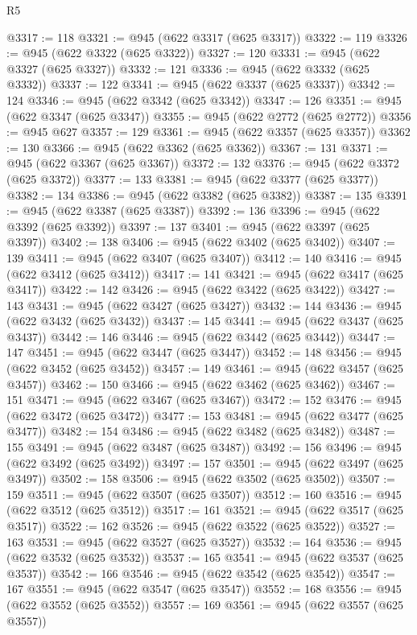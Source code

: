 \begin{lexlean}{R5}
\begin{coremodule}
@3317 := 118
@3321 := @945 (@622 @3317 (@625 @3317))
@3322 := 119
@3326 := @945 (@622 @3322 (@625 @3322))
@3327 := 120
@3331 := @945 (@622 @3327 (@625 @3327))
@3332 := 121
@3336 := @945 (@622 @3332 (@625 @3332))
@3337 := 122
@3341 := @945 (@622 @3337 (@625 @3337))
@3342 := 124
@3346 := @945 (@622 @3342 (@625 @3342))
@3347 := 126
@3351 := @945 (@622 @3347 (@625 @3347))
@3355 := @945 (@622 @2772 (@625 @2772))
@3356 := @945 @627
@3357 := 129
@3361 := @945 (@622 @3357 (@625 @3357))
@3362 := 130
@3366 := @945 (@622 @3362 (@625 @3362))
@3367 := 131
@3371 := @945 (@622 @3367 (@625 @3367))
@3372 := 132
@3376 := @945 (@622 @3372 (@625 @3372))
@3377 := 133
@3381 := @945 (@622 @3377 (@625 @3377))
@3382 := 134
@3386 := @945 (@622 @3382 (@625 @3382))
@3387 := 135
@3391 := @945 (@622 @3387 (@625 @3387))
@3392 := 136
@3396 := @945 (@622 @3392 (@625 @3392))
@3397 := 137
@3401 := @945 (@622 @3397 (@625 @3397))
@3402 := 138
@3406 := @945 (@622 @3402 (@625 @3402))
@3407 := 139
@3411 := @945 (@622 @3407 (@625 @3407))
@3412 := 140
@3416 := @945 (@622 @3412 (@625 @3412))
@3417 := 141
@3421 := @945 (@622 @3417 (@625 @3417))
@3422 := 142
@3426 := @945 (@622 @3422 (@625 @3422))
@3427 := 143
@3431 := @945 (@622 @3427 (@625 @3427))
@3432 := 144
@3436 := @945 (@622 @3432 (@625 @3432))
@3437 := 145
@3441 := @945 (@622 @3437 (@625 @3437))
@3442 := 146
@3446 := @945 (@622 @3442 (@625 @3442))
@3447 := 147
@3451 := @945 (@622 @3447 (@625 @3447))
@3452 := 148
@3456 := @945 (@622 @3452 (@625 @3452))
@3457 := 149
@3461 := @945 (@622 @3457 (@625 @3457))
@3462 := 150
@3466 := @945 (@622 @3462 (@625 @3462))
@3467 := 151
@3471 := @945 (@622 @3467 (@625 @3467))
@3472 := 152
@3476 := @945 (@622 @3472 (@625 @3472))
@3477 := 153
@3481 := @945 (@622 @3477 (@625 @3477))
@3482 := 154
@3486 := @945 (@622 @3482 (@625 @3482))
@3487 := 155
@3491 := @945 (@622 @3487 (@625 @3487))
@3492 := 156
@3496 := @945 (@622 @3492 (@625 @3492))
@3497 := 157
@3501 := @945 (@622 @3497 (@625 @3497))
@3502 := 158
@3506 := @945 (@622 @3502 (@625 @3502))
@3507 := 159
@3511 := @945 (@622 @3507 (@625 @3507))
@3512 := 160
@3516 := @945 (@622 @3512 (@625 @3512))
@3517 := 161
@3521 := @945 (@622 @3517 (@625 @3517))
@3522 := 162
@3526 := @945 (@622 @3522 (@625 @3522))
@3527 := 163
@3531 := @945 (@622 @3527 (@625 @3527))
@3532 := 164
@3536 := @945 (@622 @3532 (@625 @3532))
@3537 := 165
@3541 := @945 (@622 @3537 (@625 @3537))
@3542 := 166
@3546 := @945 (@622 @3542 (@625 @3542))
@3547 := 167
@3551 := @945 (@622 @3547 (@625 @3547))
@3552 := 168
@3556 := @945 (@622 @3552 (@625 @3552))
@3557 := 169
@3561 := @945 (@622 @3557 (@625 @3557))

\end{coremodule}
\end{lexlean}
